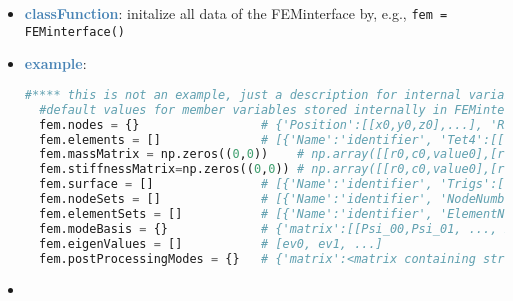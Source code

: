 \begin{itemize}[leftmargin=1.4cm]
\begin{itemize}[leftmargin=1.4cm]
\begin{itemize}[leftmargin=0.5cm]
\begin{itemize}[leftmargin=1.4cm]
\begin{itemize}[leftmargin=1.4cm]
\begin{itemize}[leftmargin=0.5cm]
\setlength{\itemindent}{0.7cm}
\begin{itemize}[leftmargin=0.7cm]
\item[--]\textcolor{steelblue}{\bf classFunction}: initalize all data of the FEMinterface by, e.g., \texttt{fem = FEMinterface()}
\item[--]\textcolor{steelblue}{\bf example}: \vspace{-12pt}\ei\begin{lstlisting}[language=Python, xleftmargin=36pt]
  #**** this is not an example, just a description for internal variables ****
  #default values for member variables stored internally in FEMinterface fem and typical structure:
  fem.nodes = {}                 # {'Position':[[x0,y0,z0],...], 'RigidBodyRxyz':[[x0,y0,z0],...],  },...]                     #dictionary of different node lists
  fem.elements = []              # [{'Name':'identifier', 'Tet4':[[n0,n1,n2,n3],...], 'Hex8':[[n0,...,n7],...],  },...]        #there may be several element sets
  fem.massMatrix = np.zeros((0,0))    # np.array([[r0,c0,value0],[r1,c1,value1], ... ])                                #currently only in SparseCSR format allowed!
  fem.stiffnessMatrix=np.zeros((0,0)) # np.array([[r0,c0,value0],[r1,c1,value1], ... ])                                #currently only in SparseCSR format allowed!
  fem.surface = []               # [{'Name':'identifier', 'Trigs':[[n0,n1,n2],...], 'Quads':[[n0,...,n3],...],  },...]           #surface with faces
  fem.nodeSets = []              # [{'Name':'identifier', 'NodeNumbers':[n_0,...,n_ns], 'NodeWeights':[w_0,...,w_ns]},...]     #for boundary conditions, etc.
  fem.elementSets = []           # [{'Name':'identifier', 'ElementNumbers':[n_0,...,n_ns]},...]                                #for different volumes, etc.
  fem.modeBasis = {}             # {'matrix':[[Psi_00,Psi_01, ..., Psi_0m],...,[Psi_n0,Psi_n1, ..., Psi_nm]],'type':'NormalModes'} #'NormalModes' are eigenmodes, 'HCBmodes' are Craig-Bampton modes including static modes
  fem.eigenValues = []           # [ev0, ev1, ...]                                                                             #eigenvalues according to eigenvectors in mode basis
  fem.postProcessingModes = {}   # {'matrix':<matrix containing stress components (xx,yy,zz,yz,xz,xy) in each column, rows are for every mesh node>,'outputVariableType':exudyn.OutputVariableType.StressLocal}\end{lstlisting}\vspace{-24pt}\bi\item[]\vspace{-24pt}\vspace{12pt}\end{itemize}

\end{itemize}
\end{itemize}
\end{itemize}
\end{itemize}
\end{itemize}
\end{itemize}
